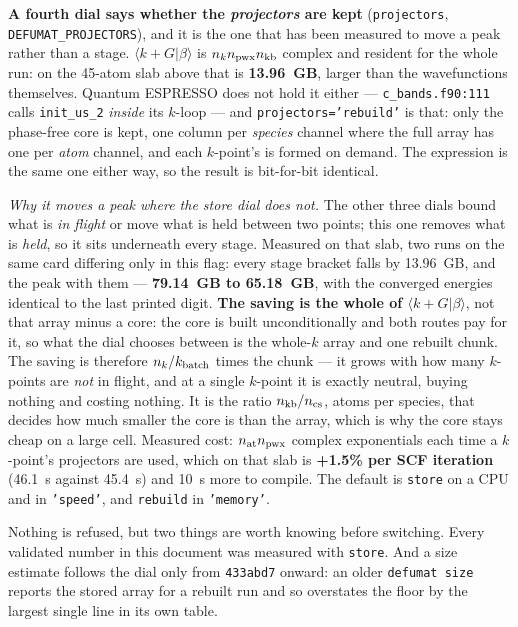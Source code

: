 \documentclass[11pt,a4paper]{article}
\newcommand{\qe}{Quantum ESPRESSO}
\newcommand{\code}[1]{\texttt{\small #1}}
\begin{document}
\textbf{A fourth dial says whether the \emph{projectors} are kept}
(\code{projectors}, \code{DEFUMAT\_PROJECTORS}), and it is the one that has been
measured to move a peak rather than a stage. $\langle k+G|\beta\rangle$ is
$n_k n_{\rm pwx} n_{\rm kb}$ complex and resident for the whole run: on the
45-atom slab above that is \textbf{13.96~GB}, larger than the wavefunctions
themselves. \qe{} does not hold it either --- \code{c\_bands.f90:111} calls
\code{init\_us\_2} \emph{inside} its $k$-loop --- and \code{projectors='rebuild'}
is that: only the phase-free core is kept, one column per \emph{species} channel
where the full array has one per \emph{atom} channel, and each $k$-point's is
formed on demand. The expression is the same one either way, so the result is
bit-for-bit identical.

\emph{Why it moves a peak where the store dial does not.} The other three dials
bound what is \emph{in flight} or move what is held between two points; this one
removes what is \emph{held}, so it sits underneath every stage. Measured on that
slab, two runs on the same card differing only in this flag: every stage bracket
falls by 13.96~GB, and the peak with them --- \textbf{79.14~GB to 65.18~GB},
with the converged energies identical to the last printed digit. \textbf{The
saving is the whole of $\langle k+G|\beta\rangle$}, not that array minus a core:
the core is built unconditionally and both routes pay for it, so what the dial
chooses between is the whole-$k$ array and one rebuilt chunk. The saving is
therefore $n_k/k_{\rm batch}$ times the chunk --- it grows with how many
$k$-points are \emph{not} in flight, and at a single $k$-point it is exactly
neutral, buying nothing and costing nothing. It is the ratio $n_{\rm kb}/n_{\rm
cs}$, atoms per species, that decides how much smaller the core is than the
array, which is why the core stays cheap on a large cell. Measured cost:
$n_{\rm at} n_{\rm pwx}$ complex exponentials each time a $k$-point's projectors
are used, which on that slab is \textbf{+1.5\% per SCF iteration} (46.1~s against
45.4~s) and 10~s more to compile. The default is \code{store} on a CPU and
in \code{'speed'}, and \code{rebuild} in \code{'memory'}.

\begin{refuses}
Nothing is refused, but two things are worth knowing before switching. Every
validated number in this document was measured with \code{store}. And a size
estimate follows the dial only from \code{433abd7} onward:
an older \code{defumat size} reports the stored array for a rebuilt run and so
overstates the floor by the largest single line in its own table.
\end{refuses}
\end{document}
